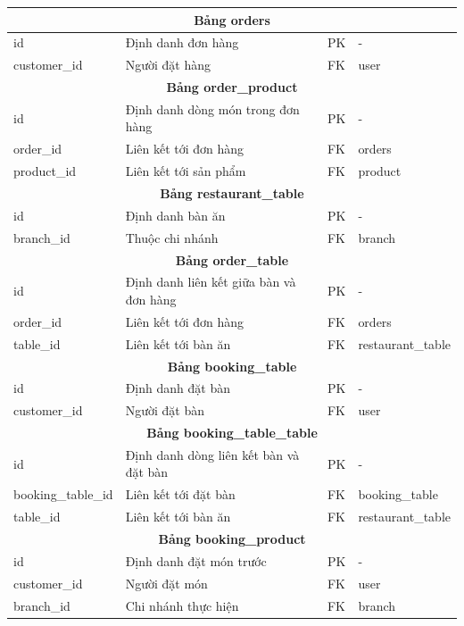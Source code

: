 \begin{longtable}{|l|p{6cm}|l|l|}
\multicolumn{4}{|c|}{\textbf{Bảng orders}} \\
\hline
id & Định danh đơn hàng & PK & - \\
customer\_id & Người đặt hàng & FK & user \\
\hline

\multicolumn{4}{|c|}{\textbf{Bảng order\_product}} \\
\hline
id & Định danh dòng món trong đơn hàng & PK & - \\
order\_id & Liên kết tới đơn hàng & FK & orders \\
product\_id & Liên kết tới sản phẩm & FK & product \\
\hline

\multicolumn{4}{|c|}{\textbf{Bảng restaurant\_table}} \\
\hline
id & Định danh bàn ăn & PK & - \\
branch\_id & Thuộc chi nhánh & FK & branch \\
\hline

\multicolumn{4}{|c|}{\textbf{Bảng order\_table}} \\
\hline
id & Định danh liên kết giữa bàn và đơn hàng & PK & - \\
order\_id & Liên kết tới đơn hàng & FK & orders \\
table\_id & Liên kết tới bàn ăn & FK & restaurant\_table \\
\hline

\multicolumn{4}{|c|}{\textbf{Bảng booking\_table}} \\
\hline
id & Định danh đặt bàn & PK & - \\
customer\_id & Người đặt bàn & FK & user \\
\hline

\multicolumn{4}{|c|}{\textbf{Bảng booking\_table\_table}} \\
\hline
id & Định danh dòng liên kết bàn và đặt bàn & PK & - \\
booking\_table\_id & Liên kết tới đặt bàn & FK & booking\_table \\
table\_id & Liên kết tới bàn ăn & FK & restaurant\_table \\
\hline

\multicolumn{4}{|c|}{\textbf{Bảng booking\_product}} \\
\hline
id & Định danh đặt món trước & PK & - \\
customer\_id & Người đặt món & FK & user \\
branch\_id & Chi nhánh thực hiện & FK & branch \\
\hline


\end{longtable}

